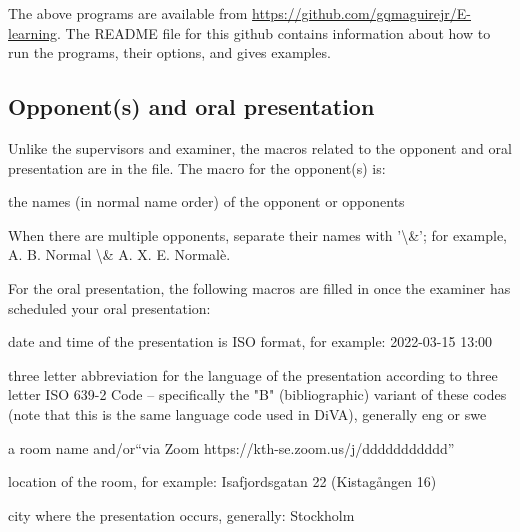 The above programs are available from \url{https://github.com/gqmaguirejr/E-learning}. The README file for this github contains information about how to run the programs, their options, and gives examples.

\subsection{Opponent(s) and oral presentation}
\label{sec:opponentMacros}
Unlike the supervisors and examiner, the macros related to the opponent and oral presentation are in the  file.
The macro for the opponent(s) is: 
\begin{description}[leftmargin=!, labelwidth =\widthof{\texttt{\textbackslash secondAuthorsFirstname\{\}}}]
\item [\texttt{\textbackslash opponentsNames\{\}}] the names (in normal name order) of the opponent or opponents
\end{description}
When there are multiple opponents, separate their names with '\textbackslash \&'; for example, A. B. Normal \textbackslash \& A. X. E. Normalè.

For the oral presentation, the following macros are filled in once the examiner has scheduled your oral presentation:
\begin{description}[leftmargin=!, labelwidth =\widthof{\texttt{\textbackslash presentationDateAndTimeISO\{\}}}]
\item [\texttt{\textbackslash presentationDateAndTimeISO\{\}}] date and time of the presentation is ISO format, for example: 2022-03-15 13:00
\item [\texttt{\textbackslash presentationLanguage\{\}}] three letter abbreviation for the language of the presentation according to three letter ISO 639-2 Code – specifically the "B" (bibliographic) variant of these codes (note that this is the same language code used in DiVA), generally eng or swe
\item [\texttt{\textbackslash presentationRoom\{\}}] a room name and/or\hspace*{\fill}\linebreak[4] ``via Zoom https://kth-se.zoom.us/j/ddddddddddd''
\item [\texttt{\textbackslash presentationAddress\{\}}] location of the room, for example: Isafjordsgatan 22 (Kistagången 16)
\item [\texttt{\textbackslash presentationCity\{\}}] city where the presentation occurs, generally: Stockholm
\end{description}


